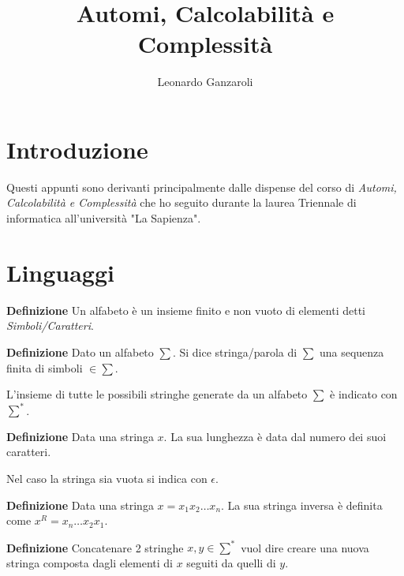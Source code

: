\documentclass{article}
\title{Automi, Calcolabilità e Complessità}
\author{Leonardo Ganzaroli}
\date{}
\begin{document}
\maketitle


\tableofcontents

\newpage

\hypersetup{allcolors=black}

\section*{Introduzione}

Questi appunti sono derivanti principalmente dalle dispense del corso di \textit{Automi, Calcolabilità e Complessità} che ho seguito durante la laurea Triennale di informatica all'università "La Sapienza".

\newpage

\section{Linguaggi}

\textbf{Definizione} Un alfabeto è un insieme finito e non vuoto di elementi detti \textit{Simboli/Caratteri}.\newline

\noindent\textbf{Definizione} Dato un alfabeto $\sum$. Si dice stringa/parola di $\sum$ una sequenza finita di simboli $\in \sum$.\newline

\noindent L'insieme di tutte le possibili stringhe generate da un alfabeto $\sum$ è indicato con $\sum^*$.\newline

\noindent\textbf{Definizione} Data una stringa $x$. La sua lunghezza è data dal numero dei suoi caratteri.\newline

\noindent Nel caso la stringa sia vuota si indica con $\epsilon$.\newline

\noindent\textbf{Definizione} Data una stringa $x=x_1x_2\ldots x_n$. La sua stringa inversa è definita come  $x^R=x_n\ldots x_2x_1$.\newline

\noindent\textbf{Definizione} Concatenare 2 stringhe $x,y\in \sum^*$ vuol dire creare una nuova stringa composta dagli elementi di $x$ seguiti da quelli di $y$.\newline
\end{document}
